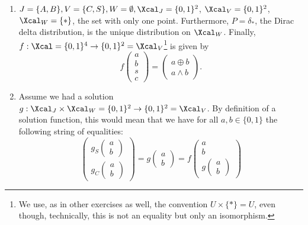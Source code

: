 \begin{enumerate}
  \begin{gradedsolution}
    \begin{enumerate}
      \item {} $J=\{A, B\}, V = \{C, S\}, W = \emptyset, \Xcal_J = \{0, 1\}^{2}$, $\Xcal_V = \{0,1\}^{2}$, $\Xcal_W = \{*\}$, the set with only one point. Furthermore, $P = \delta_*$, the Dirac delta distribution, is the unique distribution on $\Xcal_W$. Finally, $f: \Xcal = \{0,1\}^{4} \to \{0,1\}^{2} = \Xcal_V$\footnote{We use, as in other exercises as well, the convention $U \times \{*\} = U$, even though, technically, this is not an equality but only an isomorphism.} is given by
      \begin{equation}
        f \begin{pmatrix} a \\ b \\ s \\ c \end{pmatrix} = \begin{pmatrix} a \oplus b \\ a \wedge b\end{pmatrix}.
        \label{eq:causal_mechanism_half_adder}
      \end{equation}
      \item {} Assume we had a solution $g: \Xcal_J\times \Xcal_W = \{0,1\}^2 \to \{0,1\}^2 = \Xcal_V$.
      By definition of a solution function, this would mean that we have for all $a, b \in \{0,1\}$ the following string of equalities:
      \begin{equation}
        \begin{pmatrix} g_S \begin{pmatrix} a \\ b\end{pmatrix} \\ g_C \begin{pmatrix} a \\ b \end{pmatrix}\end{pmatrix}
        = g \begin{pmatrix} a \\ b\end{pmatrix}
        = f \begin{pmatrix} a \\ b \\ g \begin{pmatrix} a \\ b\end{pmatrix}\end{pmatrix}

\end{equation}
\end{enumerate}
\end{gradedsolution}
\end{enumerate}
